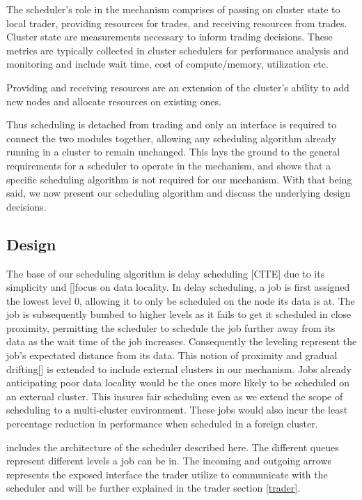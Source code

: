 The scheduler's role in the mechanism comprises of passing on cluster state to
local trader, providing resources for trades, and receiving resources from
trades. Cluster state are measurements necessary to inform trading decisions.
These metrics are typically collected in cluster schedulers for performance
analysis and monitoring and include wait time, cost of compute/memory,
utilization etc.

\noindent Providing and receiving resources are an extension of the cluster's
ability to add new nodes and allocate resources on existing ones. 

Thus scheduling is detached from trading and only an interface is required to
connect the two modules together, allowing any scheduling algorithm already
running in a cluster to remain unchanged. This lays the ground to the general
requirements for a scheduler to operate in the mechanism, and shows that a
specific scheduling algorithm is not required for our mechanism. With that
being said, we now present our scheduling algorithm and discuss the underlying
design decisions. 

\subsection{Design}

The base of our scheduling algorithm is delay scheduling [CITE] due to its
simplicity and []focus on data locality. In delay scheduling, a job is first
assigned the lowest level 0, allowing it to only be scheduled on the node its
data is at. The job is subsequently bumbed to higher levels as it fails to get
it scheduled in close proximity, permitting the scheduler to schedule the job
further away from its data as the wait time of the job increases. Consequently
the leveling represent the job's expectated distance from its data. This notion
of proximity and gradual drifting[] is extended to include external clusters in
our mechanism. Jobs already anticipating poor data locality would be the ones
more likely to be scheduled on an external cluster. This insures fair
scheduling even as we extend the scope of scheduling to a multi-cluster
environment. These jobs would also incur the least percentage reduction in
performance when scheduled in a foreign cluster.

 includes the architecture of the scheduler described here. The
different queues represent different levels a job can be in. The incoming and
outgoing arrows represents the exposed interface the trader utilize to
communicate with the scheduler and will be further explained in the trader
section \ref{trader}. 

